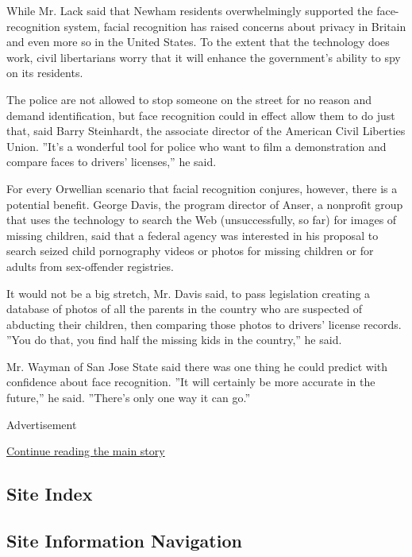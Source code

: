 While Mr. Lack said that Newham residents overwhelmingly supported the
face-recognition system, facial recognition has raised concerns about
privacy in Britain and even more so in the United States. To the extent
that the technology does work, civil libertarians worry that it will
enhance the government's ability to spy on its residents.

The police are not allowed to stop someone on the street for no reason
and demand identification, but face recognition could in effect allow
them to do just that, said Barry Steinhardt, the associate director of
the American Civil Liberties Union. ''It's a wonderful tool for police
who want to film a demonstration and compare faces to drivers'
licenses,'' he said.

For every Orwellian scenario that facial recognition conjures, however,
there is a potential benefit. George Davis, the program director of
Anser, a nonprofit group that uses the technology to search the Web
(unsuccessfully, so far) for images of missing children, said that a
federal agency was interested in his proposal to search seized child
pornography videos or photos for missing children or for adults from
sex-offender registries.

It would not be a big stretch, Mr. Davis said, to pass legislation
creating a database of photos of all the parents in the country who are
suspected of abducting their children, then comparing those photos to
drivers' license records. ''You do that, you find half the missing kids
in the country,'' he said.

Mr. Wayman of San Jose State said there was one thing he could predict
with confidence about face recognition. ''It will certainly be more
accurate in the future,'' he said. ''There's only one way it can go.''

Advertisement

\protect\hyperlink{after-bottom}{Continue reading the main story}

\hypertarget{site-index}{%
\subsection{Site Index}\label{site-index}}

\hypertarget{site-information-navigation}{%
\subsection{Site Information
Navigation}\label{site-information-navigation}}

